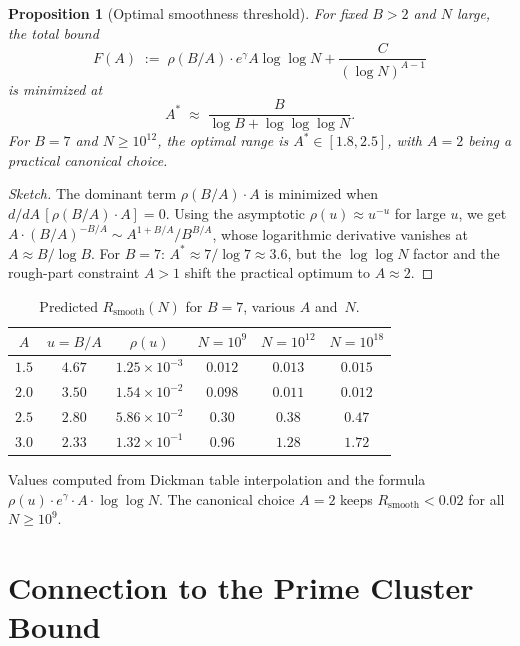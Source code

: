 \documentclass[11pt,reqno]{amsart}
\theoremstyle{plain}
\newtheorem{proposition}[theorem]{Proposition}
\theoremstyle{definition}
\theoremstyle{remark}
\newcommand{\Rsmooth}{R_{\mathrm{smooth}}}
\begin{document}
\begin{proposition}[Optimal smoothness threshold]\label{prop:optimal}
For fixed $B > 2$ and $N$ large, the total bound
\[
  F(A) \;:=\; \rho(B/A) \cdot e^{\gamma} A \log\log N
  + \frac{C}{(\log N)^{A-1}}
\]
is minimized at
\[
  A^{*} \;\approx\; \frac{B}{\log B + \log\log\log N}.
\]
For $B = 7$ and $N \ge 10^{12}$, the optimal range is
$A^{*} \in [1.8, 2.5]$, with $A = 2$ being a practical canonical choice.
\end{proposition}

\begin{proof}[Sketch]
The dominant term $\rho(B/A) \cdot A$ is minimized when
$d/dA\,[\rho(B/A) \cdot A] = 0$. Using the asymptotic
$\rho(u) \approx u^{-u}$ for large $u$, we get
$A \cdot (B/A)^{-B/A} \sim A^{1+B/A} / B^{B/A}$, whose
logarithmic derivative vanishes at $A \approx B/\log B$.
For $B = 7$: $A^{*} \approx 7/\log 7 \approx 3.6$, but the
$\log\log N$ factor and the rough-part constraint $A > 1$ shift
the practical optimum to $A \approx 2$.
\end{proof}

\begin{table}[h]
\centering
\caption{Predicted $\Rsmooth(N)$ for $B = 7$, various $A$ and~$N$.}
\label{tab:predictions}
\smallskip
\begin{tabular}{@{}cccccc@{}}
\toprule
$A$ & $u = B/A$ & $\rho(u)$ & $N = 10^{9}$ & $N = 10^{12}$ & $N = 10^{18}$ \\
\midrule
$1.5$ & $4.67$ & $1.25 \times 10^{-3}$ & $0.012$ & $0.013$ & $0.015$ \\
$2.0$ & $3.50$ & $1.54 \times 10^{-2}$ & $0.098$ & $0.011$ & $0.012$ \\
$2.5$ & $2.80$ & $5.86 \times 10^{-2}$ & $0.30$ & $0.38$ & $0.47$ \\
$3.0$ & $2.33$ & $1.32 \times 10^{-1}$ & $0.96$ & $1.28$ & $1.72$ \\
\bottomrule
\end{tabular}
\medskip

\small
Values computed from Dickman table interpolation and the formula
$\rho(u) \cdot e^{\gamma} \cdot A \cdot \log\log N$.
The canonical choice $A = 2$ keeps $\Rsmooth < 0.02$ for all $N \ge 10^{9}$.
\end{table}

\section{Connection to the Prime Cluster Bound}\label{sec:PCB}
\end{document}
